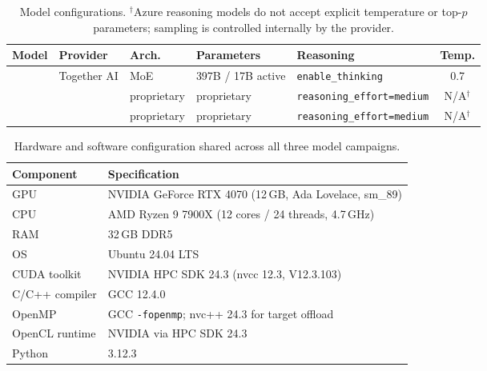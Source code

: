 \begin{table}[htbp]
\centering
\caption{Model configurations. $^\dagger$Azure reasoning models do not accept
explicit temperature or top-$p$ parameters; sampling is controlled internally by
the provider.}
\label{tab:model-config}
\footnotesize
\begin{tabular}{@{}lllllc@{}}
\toprule
Model & Provider & Arch. & Parameters & Reasoning & Temp. \\
\midrule
\qwen{} & Together AI & MoE & 397B / 17B active & \texttt{enable\_thinking} & 0.7 \\
\gptnew{} & \gptprovider{} & proprietary & proprietary & \texttt{reasoning\_effort=medium} & N/A$^\dagger$ \\
\codex{} & \gptprovider{} & proprietary & proprietary & \texttt{reasoning\_effort=medium} & N/A$^\dagger$ \\
\bottomrule
\end{tabular}
\end{table}

\begin{table}[htbp]
\centering
\caption{Hardware and software configuration shared across all three model
campaigns.}
\label{tab:hardware}
\small
\begin{tabular}{@{}ll@{}}
\toprule
Component & Specification \\
\midrule
GPU & NVIDIA GeForce RTX 4070 (12\,GB, Ada Lovelace, sm\_89) \\
CPU & AMD Ryzen 9 7900X (12 cores / 24 threads, 4.7\,GHz) \\
RAM & 32\,GB DDR5 \\
OS & Ubuntu 24.04 LTS \\
CUDA toolkit & NVIDIA HPC SDK 24.3 (nvcc 12.3, V12.3.103) \\
C/C++ compiler & GCC 12.4.0 \\
OpenMP & GCC \texttt{-fopenmp}; nvc++ 24.3 for target offload \\
OpenCL runtime & NVIDIA via HPC SDK 24.3 \\
Python & 3.12.3 \\
\bottomrule
\end{tabular}
\end{table}

